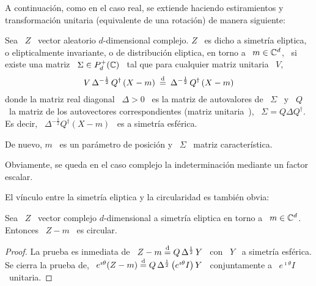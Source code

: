 A continuaci\'on,  como en  el caso real,  se extiende haciendo  estiramientos y
transformaci\'on unitaria (equivalente de una rotaci\'on) de manera siguiente:
%
\begin{definicion}
  Sea  \ $Z$  \ vector  aleatorio $d$-dimensional  complejo.  $Z$  \ es  dicho a
  simetr\'ia  eliptica,   o  elipticalmente  invariante,   o  de  distribuci\'on
  eliptica, en torno a \ $m \in  \mathbb{C}^d$, \ si existe una matriz \ $\Sigma \in
  P_d^+(\mathbb{C})$ \ tal que para cualquier matriz unitaria \ $V$,
  \[
  V  \,   \Delta^{-\frac12}  \,  Q^\dag  \left(   X  -  m  \right)   \:  \stackrel{\mathrm{d}}{=}  \:
  \Delta^{-\frac12} \, Q^\dag \left( X - m \right)
  \]
  donde la matriz real diagonal \ $\Delta  > 0$ \ es la matriz de autovalores de
  \ $\Sigma$ \ y \ $Q$  \ la matriz de los autovectores correspondientes (matriz
  unitaria~\cite{Bha97,  Bha07, HorJoh13}),  \ $\Sigma  = Q  \Delta  Q^\dag$. Es
  decir, \  $\Delta^{-\frac12} Q^\dag \left(  X - m  \right)$ \ es  a simetr\'ia
  esf\'erica.

  De  nuevo, $m$  \  es  un par\'ametro  de  posici\'on y  \  $\Sigma$ \  matriz
  caracter\'istica.
\end{definicion}
%
Obviamente, se queda en el caso complejo la indeterminaci\'on mediante un factor
escalar.

El v\'inculo entre la simetr\'ia eliptica y la circularidad es tambi\'en obvia:
%
\begin{lema}
  Sea \ $Z$ \ vector complejo  $d$-dimensional a simetr\'ia eliptica en torno a
  \ $m \in \mathbb{C}^d$. Entonces \ $Z-m$ \ es circular.
\end{lema}
%
\begin{proof}
  La prueba es  inmediata de \ $Z-m \stackrel{\mathrm{d}}{=}  Q \, \Delta^{\frac12} \, Y$  \ con \
  $Y$ \  a simetr\'ia  esf\'erica. Se  cierra la prueba  de, \  $e^{\imath \theta}
  (Z-m) \stackrel{\mathrm{d}}{=} Q \, \Delta^{\frac12} \,  \big( e^{\imath \theta} I \big) \, Y$ \
  conjuntamente a \ $e^{\imath \theta} I$ \ unitaria.
\end{proof}

